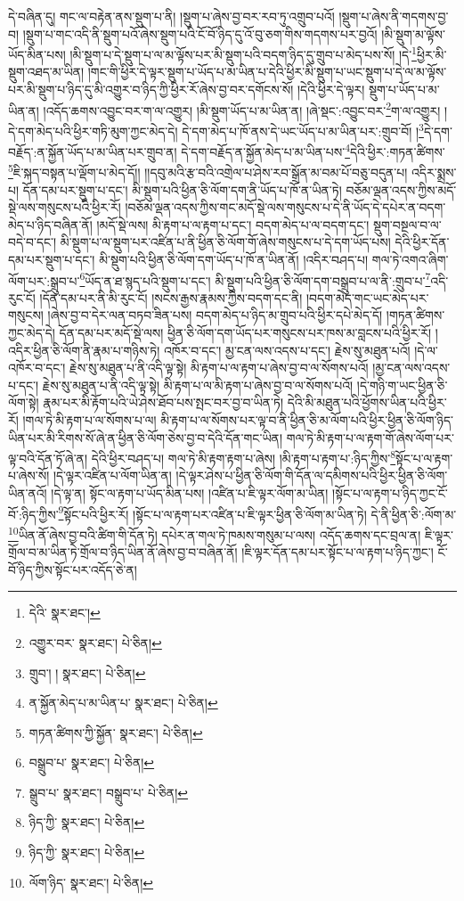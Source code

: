 དེ་བཞིན་དུ། གང་ལ་བརྟེན་ནས་སྡུག་པ་ནི། །སྡུག་པ་ཞེས་བྱ་བར་རབ་ཏུ་འགྲུབ་པའོ། །སྡུག་པ་ཞེས་ནི་གདགས་བྱ་བ། །སྡུག་པ་གང་འདི་ནི་སྡུག་པའོ་ཞེས་སྡུག་པའི་ངོ་བོ་ཉིད་དུ་འོ་བུ་ཅག་གིས་གདགས་པར་བྱའོ། །མི་སྡུག་མ་ལྟོས་ཡོད་མིན་པས། །མི་སྡུག་པ་དེ་སྡུག་པ་ལ་མ་ལྟོས་པར་མི་སྡུག་པའི་བདག་ཉིད་དུ་གྲུབ་པ་མེད་པས་སོ། །དེ་\footnote{དེའི་  སྣར་ཐང་། }ཕྱིར་མི་སྡུག་འཐད་མ་ཡིན། །གང་གི་ཕྱིར་དེ་ལྟར་སྡུག་པ་ཡོད་པ་མ་ཡིན་པ་དེའི་ཕྱིར་མི་སྡུག་པ་ཡང་སྡུག་པ་དེ་ལ་མ་ལྟོས་པར་མི་སྡུག་པ་ཉིད་དུ་མི་འགྱུར་བ་ཉིད་ཀྱི་ཕྱིར་རོ་ཞེས་བྱ་བར་དགོངས་སོ། །དེའི་ཕྱིར་དེ་ལྟར། སྡུག་པ་ཡོད་པ་མ་ཡིན་ན། །འདོད་ཆགས་འབྱུང་བར་ག་ལ་འགྱུར། །མི་སྡུག་ཡོད་པ་མ་ཡིན་ན། །ཞེ་སྡང་:འབྱུང་བར་\footnote{འགྱུར་བར་  སྣར་ཐང་།  པེ་ཅིན། }ག་ལ་འགྱུར། །དེ་དག་མེད་པའི་ཕྱིར་གཏི་མུག་ཀྱང་མེད་དེ། དེ་དག་མེད་པ་ཁོ་ནས་དེ་ཡང་ཡོད་པ་མ་ཡིན་པར་:གྲུབ་བོ། །\footnote{གྲུབ་། །   སྣར་ཐང་།  པེ་ཅིན། }དེ་དག་བརྗོད་:ན་སྐྱོན་ཡོད་པ་མ་ཡིན་པར་གྲུབ་ན། དེ་དག་བརྗོད་ན་སྐྱོན་མེད་པ་མ་ཡིན་པས་\footnote{ན་སྐྱོན་མེད་པ་མ་ཡིན་པ་  སྣར་ཐང་།  པེ་ཅིན། }དེའི་ཕྱིར་:གཏན་ཚིགས་\footnote{གཏན་ཚིགས་ཀྱི་སྐྱོན་  སྣར་ཐང་།  པེ་ཅིན། }ཇི་སྐད་བསྟན་པ་ལྡོག་པ་མེད་དོ།། །།དབུ་མའི་རྩ་བའི་འགྲེལ་པ་ཤེས་རབ་སྒྲོན་མ་བམ་པོ་བཅུ་བདུན་པ། འདིར་སྨྲས་པ། དོན་དམ་པར་སྡུག་པ་དང་། མི་སྡུག་པའི་ཕྱིན་ཅི་ལོག་དག་ནི་ཡོད་པ་ཁོ་ན་ཡིན་ཏེ། བཅོམ་ལྡན་འདས་ཀྱིས་མདོ་སྡེ་ལས་གསུངས་པའི་ཕྱིར་རོ། །བཅོམ་ལྡན་འདས་ཀྱིས་གང་མདོ་སྡེ་ལས་གསུངས་པ་དེ་ནི་ཡོད་དེ་དཔེར་ན་བདག་མེད་པ་ཉིད་བཞིན་ནོ། །མདོ་སྡེ་ལས། མི་རྟག་པ་ལ་རྟག་པ་དང་། བདག་མེད་པ་ལ་བདག་དང་། སྡུག་བསྔལ་བ་ལ་བདེ་བ་དང་། མི་སྡུག་པ་ལ་སྡུག་པར་འཛིན་པ་ནི་ཕྱིན་ཅི་ལོག་གོ་ཞེས་གསུངས་པ་དེ་དག་ཡོད་པས། དེའི་ཕྱིར་དོན་དམ་པར་སྡུག་པ་དང་། མི་སྡུག་པའི་ཕྱིན་ཅི་ལོག་དག་ཡོད་པ་ཁོ་ན་ཡིན་ནོ། །འདིར་བཤད་པ། གལ་ཏེ་འགའ་ཞིག་ལོག་པར་:སྒྲུབ་པ་\footnote{བསྒྲུབ་པ་  སྣར་ཐང་།  པེ་ཅིན། }ཡོད་ན་ཐ་སྙད་པའི་སྡུག་པ་དང་། མི་སྡུག་པའི་ཕྱིན་ཅི་ལོག་དག་བསྒྲུབ་པ་ལ་ནི་:གྲུབ་པ་\footnote{སྒྲུབ་པ་  སྣར་ཐང་། བསྒྲུབ་པ་  པེ་ཅིན། }འདི་རུང་ངོ། །དོན་དམ་པར་ནི་མི་རུང་ངོ། །སངས་རྒྱས་རྣམས་ཀྱིས་བདག་དང་ནི། །བདག་མེད་གང་ཡང་མེད་པར་གསུངས། །ཞེས་བྱ་བ་དེར་ལན་བཏབ་ཟིན་པས། བདག་མེད་པ་ཉིད་མ་གྲུབ་པའི་ཕྱིར་དཔེ་མེད་དོ། །གཏན་ཚིགས་ཀྱང་མེད་དེ། དོན་དམ་པར་མདོ་སྡེ་ལས། ཕྱིན་ཅི་ལོག་དག་ཡོད་པར་གསུངས་པར་ཁས་མ་བླངས་པའི་ཕྱིར་རོ། །འདིར་ཕྱིན་ཅི་ལོག་ནི་རྣམ་པ་གཉིས་ཏེ། འཁོར་བ་དང་། མྱ་ངན་ལས་འདས་པ་དང་། རྗེས་སུ་མཐུན་པའོ། །དེ་ལ་འཁོར་བ་དང་། རྗེས་སུ་མཐུན་པ་ནི་འདི་ལྟ་སྟེ། མི་རྟག་པ་ལ་རྟག་པ་ཞེས་བྱ་བ་ལ་སོགས་པའོ། །མྱ་ངན་ལས་འདས་པ་དང་། རྗེས་སུ་མཐུན་པ་ནི་འདི་ལྟ་སྟེ། མི་རྟག་པ་ལ་མི་རྟག་པ་ཞེས་བྱ་བ་ལ་སོགས་པའོ། །དེ་གཉི་ག་ཡང་ཕྱིན་ཅི་ལོག་སྟེ། རྣམ་པར་མི་རྟོག་པའི་ཡེ་ཤེས་ཐོབ་པས་སྤང་བར་བྱ་བ་ཡིན་ཏེ། དེའི་མི་མཐུན་པའི་ཕྱོགས་ཡིན་པའི་ཕྱིར་རོ། །གལ་ཏེ་མི་རྟག་པ་ལ་སོགས་པ་ལ། མི་རྟག་པ་ལ་སོགས་པར་ལྟ་བ་ནི་ཕྱིན་ཅི་མ་ལོག་པའི་ཕྱིར་ཕྱིན་ཅི་ལོག་ཉིད་ཡིན་པར་མི་རིགས་སོ་ཞེ་ན་ཕྱིན་ཅི་ལོག་ཅེས་བྱ་བ་དེའི་དོན་གང་ཡིན། གལ་ཏེ་མི་རྟག་པ་ལ་རྟག་གོ་ཞེས་ལོག་པར་ལྟ་བའི་དོན་ཏོ་ཞེ་ན། དེའི་ཕྱིར་བཤད་པ། གལ་ཏེ་མི་རྟག་རྟག་པ་ཞེས། །མི་རྟག་པ་རྟག་པ་:ཉིད་ཀྱིས་\footnote{ཉིད་ཀྱི་  སྣར་ཐང་།  པེ་ཅིན། }སྟོང་པ་ལ་རྟག་པ་ཞེས་སོ། །དེ་ལྟར་འཛིན་པ་ལོག་ཡིན་ན། །དེ་ལྟར་ཤེས་པ་ཕྱིན་ཅི་ལོག་གི་དོན་ལ་དམིགས་པའི་ཕྱིར་ཕྱིན་ཅི་ལོག་ཡིན་ནའོ། །དེ་ལྟ་ན། སྟོང་ལ་རྟག་པ་ཡོད་མིན་པས། །འཛིན་པ་ཇི་ལྟར་ལོག་མ་ཡིན། །སྟོང་པ་ལ་རྟག་པ་ཉིད་ཀྱང་ངོ་བོ་:ཉིད་ཀྱིས་\footnote{ཉིད་ཀྱི་  སྣར་ཐང་།  པེ་ཅིན། }སྟོང་པའི་ཕྱིར་རོ། །སྟོང་པ་ལ་རྟག་པར་འཛིན་པ་ཇི་ལྟར་ཕྱིན་ཅི་ལོག་མ་ཡིན་ཏེ། དེ་ནི་ཕྱིན་ཅི་:ལོག་མ་\footnote{ལོག་ཉིད་  སྣར་ཐང་།  པེ་ཅིན། }ཡིན་ནོ་ཞེས་བྱ་བའི་ཚིག་གི་དོན་ཏེ། དཔེར་ན་གལ་ཏེ་ཁམས་གསུམ་པ་ལས། འདོད་ཆགས་དང་བྲལ་ན། ཇི་ལྟར་གྲོལ་བ་མ་ཡིན་ཏེ་གྲོལ་བ་ཉིད་ཡིན་ནོ་ཞེས་བྱ་བ་བཞིན་ནོ། །ཇི་ལྟར་དོན་དམ་པར་སྟོང་པ་ལ་རྟག་པ་ཉིད་ཀྱང་། ངོ་བོ་ཉིད་ཀྱིས་སྟོང་པར་འདོད་ཅེ་ན། 
